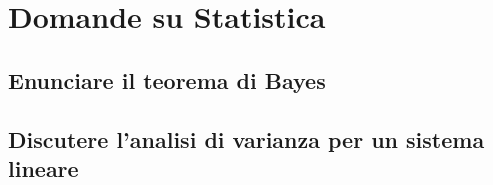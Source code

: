 \documentclass[\main/main.tex]{subfiles}
\begin{document}
\section{Domande su Statistica}

\clearpage

\clearpage


\subsection{Enunciare il teorema di Bayes}
\bayesTh

\subsection{Discutere l'analisi di varianza per un sistema lineare}


\end{document}
